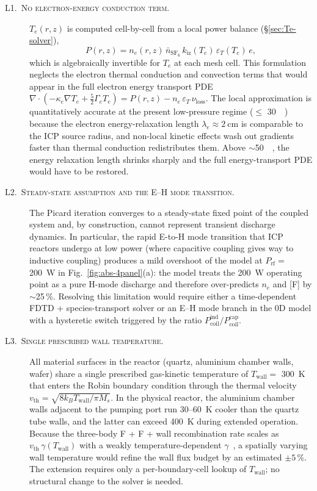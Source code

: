 \documentclass[11pt,a4paper]{report}
\begin{document}
\begin{description}

  \item[\textsc{L1.\ No electron-energy conduction term.}]  $T_e(r,z)$ is computed cell-by-cell from a local power balance (\S\ref{sec:Te-solver}),
  \begin{equation}
    P(r,z) = n_e(r,z)\,\bar{n}_{\mathrm{SF}_6}\,k_\mathrm{iz}(T_e)\,\varepsilon_T(T_e)\,e,
    \label{eq:Te-local}
  \end{equation}
  which is algebraically invertible for $T_e$ at each mesh cell.  This formulation neglects the electron thermal conduction and convection terms that would appear in the full electron energy transport PDE $\nabla \!\cdot\! (-\kappa_e \nabla T_e + \tfrac{5}{2}\Gamma_e T_e) = P(r,z) - n_e\,\varepsilon_T\,\nu_\mathrm{loss}$.  The local approximation is quantitatively accurate at the present low-pressure regime ($\leq$ \SI{30}{\milli\torr}) because the electron energy-relaxation length $\lambda_e \approx \SI{2}{\centi\meter}$ is comparable to the ICP source radius, and non-local kinetic effects wash out gradients faster than thermal conduction redistributes them.  Above $\sim$\SI{50}{\milli\torr}, the energy relaxation length shrinks sharply and the full energy-transport PDE would have to be restored.

  \item[\textsc{L2.\ Steady-state assumption and the E--H mode transition.}]  The Picard iteration converges to a steady-state fixed point of the coupled system and, by construction, cannot represent transient discharge dynamics.  In particular, the rapid E-to-H mode transition that ICP reactors undergo at low power (where capacitive coupling gives way to inductive coupling) produces a mild overshoot of the model at $P_\mathrm{rf} = $ \SI{200}{\watt} in Fig.~\ref{fig:abs-4panel}(a): the model treats the \SI{200}{\watt} operating point as a pure H-mode discharge and therefore over-predicts $n_e$ and [F] by $\sim$25\,\%.  Resolving this limitation would require either a time-dependent FDTD + species-transport solver or an E--H mode branch in the 0D model with a hysteretic switch triggered by the ratio $P_\mathrm{coil}^{\mathrm{ind}}/P_\mathrm{coil}^{\mathrm{cap}}$.

  \item[\textsc{L3.\ Single prescribed wall temperature.}]  All material surfaces in the reactor (quartz, aluminium chamber walls, wafer) share a single prescribed gas-kinetic temperature of $T_\mathrm{wall} = $ \SI{300}{\kelvin} that enters the Robin boundary condition through the thermal velocity $v_\mathrm{th} = \sqrt{8 k_B T_\mathrm{wall} / \pi M_s}$.  In the physical reactor, the aluminium chamber walls adjacent to the pumping port run 30--\SI{60}{\kelvin} cooler than the quartz tube walls, and the latter can exceed \SI{400}{\kelvin} during extended operation.  Because the three-body F + F + wall recombination rate scales as $v_\mathrm{th}\,\gamma(T_\mathrm{wall})$ with a weakly temperature-dependent $\gamma$~\cite{Kokkoris2009}, a spatially varying wall temperature would refine the wall flux budget by an estimated $\pm 5\,\%$.  The extension requires only a per-boundary-cell lookup of $T_\mathrm{wall}$; no structural change to the solver is needed.


\end{description}
\end{document}
